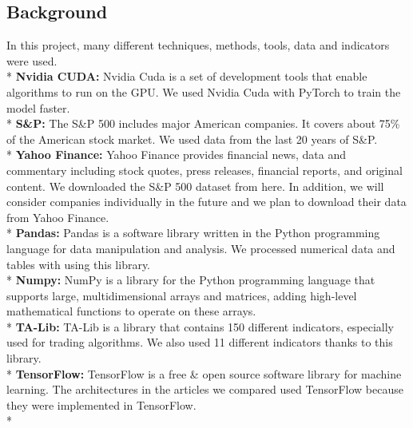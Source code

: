 \documentclass{article}
\begin{document}
\begin{center}
    \item\section{Background}
\end{center}
In this project, many different techniques, methods, tools, data and indicators were used.\vspace{0.25cm} \\*
\textbf{Nvidia CUDA:} Nvidia Cuda is a set of development tools that enable algorithms to run on the GPU. We used Nvidia Cuda with PyTorch to train the model faster.\vspace{0.1cm}\\*
\textbf{S\&P:} The S\&P 500 includes major American companies. It covers about 75\% of the American stock market. We used data from the last 20 years of S\&P.\vspace{0.1cm}\\*
\textbf{Yahoo Finance:} Yahoo Finance provides financial news, data and commentary including stock quotes, press releases, financial reports, and original content. We downloaded the S\&P 500 dataset from here. In addition, we will consider companies individually in the future and we plan to download their data from Yahoo Finance.\vspace{0.1cm}\\*
\textbf{Pandas:} Pandas is a software library written in the Python programming language for data manipulation and analysis. We processed numerical data and tables with using this library.\vspace{0.1cm}\\*
\textbf{Numpy:} NumPy is a library for the Python programming language that supports large, multidimensional arrays and matrices, adding high-level mathematical functions to operate on these arrays.\vspace{0.1cm}\\*
\textbf{TA-Lib:} TA-Lib is a library that contains 150 different indicators, especially used for trading algorithms. We also used 11 different indicators thanks to this library.\vspace{0.1cm}\\*
\textbf{TensorFlow:} TensorFlow is a free \& open source software library for machine learning. The architectures in the articles we compared used TensorFlow because they were implemented in TensorFlow.\vspace{0.1cm}\\*
\end{document}
